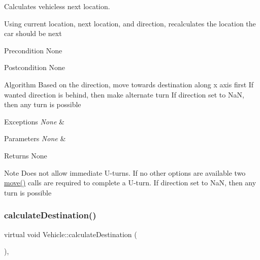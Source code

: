Calculates vehicles\textquotesingle{}s next location. 

Using current location, next location, and direction, recalculates the location the car should be next

\begin{DoxyPrecond}{Precondition}
None
\end{DoxyPrecond}
\begin{DoxyPostcond}{Postcondition}
None
\end{DoxyPostcond}
\begin{DoxyParagraph}{Algorithm}
Based on the direction, move towards destination along x axis first If wanted direction is behind, then make alternate turn If direction set to NaN, then any turn is possible
\end{DoxyParagraph}

\begin{DoxyExceptions}{Exceptions}
{\em None} & \\
\hline
\end{DoxyExceptions}

\begin{DoxyParams}{Parameters}
{\em None} & \\
\hline
\end{DoxyParams}
\begin{DoxyReturn}{Returns}
None
\end{DoxyReturn}
\begin{DoxyNote}{Note}
Does not allow immediate U-\/turns. If no other options are available two \hyperlink{class_vehicle_a257dd3b4dd777389bffea92476c2971a}{move()} calls are required to complete a U-\/turn. If direction set to NaN, then any turn is possible 
\end{DoxyNote}
\hypertarget{class_vehicle_a90c2c61dde3e87728bca29b4ebe40a95}{}\label{class_vehicle_a90c2c61dde3e87728bca29b4ebe40a95} 
\subsubsection{\texorpdfstring{calculate\+Destination()}{calculateDestination()}}
{\footnotesize\ttfamily virtual void Vehicle\+::calculate\+Destination (\begin{DoxyParamCaption}{ }\end{DoxyParamCaption})\hspace{0.3cm}{\ttfamily [protected]}, {}}



